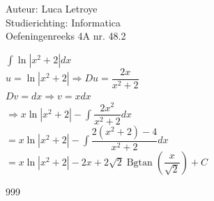 \documentclass[a4paper]{article}
\newcommand{\dint}{\displaystyle\int}
\newcommand{\bgtan}{\operatorname{Bgtan}}
\begin{document}
  
\noindent \large Auteur: Luca Letroye \\
\noindent \large Studierichting: Informatica\\
\noindent \large Oefeningenreeks 4A nr. 48.2

\medskip
\normalsize

$\dint \ln|x^2+2|dx$\\

$ u = \ln|x^2+2| \Rightarrow Du = \dfrac{2x}{x^2+2}$\\

$ Dv = dx \Rightarrow v = xdx$\\

$\Rightarrow x\ln|x^2+2| - \dint\dfrac{2x^2}{x^2+2}dx$\\

$= x\ln|x^2+2| - \dint\dfrac{2(x^2+2)-4}{x^2+2}dx$\\

$= x\ln|x^2+2| - 2x+2\sqrt{2}\bgtan\left(\dfrac{x}{\sqrt{2}}\right)+C$\\



\begin{thebibliography}{999}
\end{thebibliography}
\end{document}
